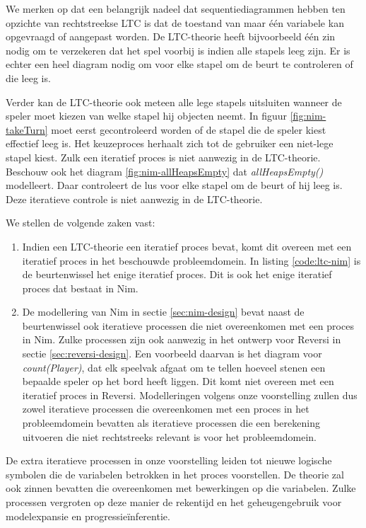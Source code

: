 We merken op dat een belangrijk nadeel dat sequentiediagrammen hebben ten opzichte van rechtstreekse LTC is dat de toestand van maar \'e\'en variabele kan opgevraagd of aangepast worden. De LTC-theorie heeft bijvoorbeeld \'e\'en zin nodig om te verzekeren dat het spel voorbij is indien alle stapels leeg zijn. Er is echter een heel diagram nodig om voor elke stapel om de beurt te controleren of die leeg is.

Verder kan de LTC-theorie ook meteen alle lege stapels uitsluiten wanneer de speler moet kiezen van welke stapel hij objecten neemt. In figuur \ref{fig:nim-takeTurn} moet eerst gecontroleerd worden of de stapel die de speler kiest effectief leeg is. Het keuzeproces herhaalt zich tot de gebruiker een niet-lege stapel kiest. Zulk een iteratief proces is niet aanwezig in de LTC-theorie. Beschouw ook het diagram \ref{fig:nim-allHeapsEmpty} dat \textit{allHeapsEmpty()} modelleert. Daar controleert de lus voor elke stapel om de beurt of hij leeg is. Deze iteratieve controle is niet aanwezig in de LTC-theorie.

We stellen de volgende zaken vast:

\begin{enumerate}
	\item Indien een LTC-theorie een iteratief proces bevat, komt dit overeen met een iteratief proces in het beschouwde probleemdomein. In listing \ref{code:ltc-nim} is de beurtenwissel het enige iteratief proces. Dit is ook het enige iteratief proces dat bestaat in Nim.
	\item De modellering van Nim in sectie \ref{sec:nim-design} bevat naast de beurtenwissel ook iteratieve processen die niet overeenkomen met een proces in Nim. Zulke processen zijn ook aanwezig in het ontwerp voor Reversi in sectie \ref{sec:reversi-design}. Een voorbeeld daarvan is het diagram voor \textit{count(Player)}, dat elk speelvak afgaat om te tellen hoeveel stenen een bepaalde speler op het bord heeft liggen. Dit komt niet overeen met een iteratief proces in Reversi. Modelleringen volgens onze voorstelling zullen dus zowel iteratieve processen die overeenkomen met een proces in het probleemdomein bevatten als iteratieve processen die een berekening uitvoeren die niet rechtstreeks relevant is voor het probleemdomein.
\end{enumerate}

De extra iteratieve processen in onze voorstelling leiden tot nieuwe logische symbolen die de variabelen betrokken in het proces voorstellen. De theorie zal ook zinnen bevatten die overeenkomen met bewerkingen op die variabelen. Zulke processen vergroten op deze manier de rekentijd en het geheugengebruik voor modelexpansie en progressie\"inferentie.

